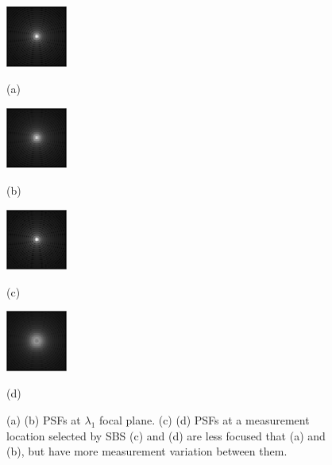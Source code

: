 \documentclass{article}
\begin{document}
\begin{figure}[t]
\begin{minipage}[b]{0.23\linewidth}
  \centering
  \centerline{\includegraphics[width=2.0cm]{psf_focus1}}
  \centerline{(a)}
\end{minipage}
\begin{minipage}[b]{0.23\linewidth}
  \centering
  \centerline{\includegraphics[width=2.0cm]{psf_focus2}}
  \centerline{(b)}
\end{minipage}
\begin{minipage}[b]{0.23\linewidth}
  \centering
  \centerline{\includegraphics[width=2.0cm]{psf_csbs1}}
  \centerline{(c)}
\end{minipage}
\begin{minipage}[b]{0.23\linewidth}
  \centering
  \centerline{\includegraphics[width=2.0cm]{psf_csbs2}}
  \centerline{(d)}
\end{minipage}
\caption{(a) (b) PSFs at $\lambda_1$ focal plane. (c) (d) PSFs at a measurement location selected by SBS
  (c) and (d) are less focused that (a) and (b), but have more measurement variation between them.
}
\label{fig:psfs_compare}
\end{figure}

\end{document}
